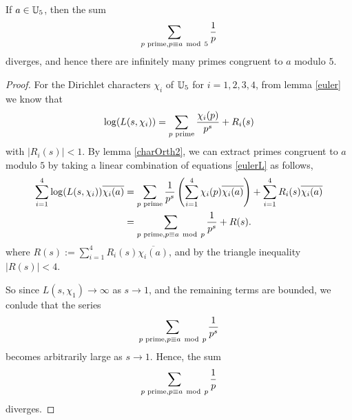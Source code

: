 \documentclass{unswmaths}
\begin{document}
    \begin{theorem}
        If $a \in \mathbb{U}_5$, then the sum
        \begin{equation*}
            \sum_{{p\text{ prime}}, p \equiv a \;\operatorname{mod}\;5} \frac{1}{p}
        \end{equation*}
        diverges, and hence there are infinitely many primes congruent to $a$ modulo $5$.
    \end{theorem}
    \begin{proof}
        For the Dirichlet characters $\chi_i$ of $\mathbb{U}_5$ for $i = 1,2,3,4$, from lemma \ref{euler} we know that
        \begin{equation*}
        \label{eulerL}
            \log(L(s,\chi_i)) = \sum_{{p\text{ prime}}} \frac{\chi_i(p)}{p^s}+R_i(s)
        \end{equation*}
        with $|R_i(s)| < 1$. By lemma \ref{charOrth2}, we can extract primes congruent to $a$ modulo $5$
        by taking a linear combination of equations \ref{eulerL} as follows,
        \begin{align*}
            \sum_{i=1}^4 \log(L(s,\chi_i))\overline{\chi_i(a)} &= \sum_{{p\text{ prime}}} \frac{1}{p^s}\left(\sum_{i=1}^4 \chi_i(p)\overline{\chi_i(a)}\right) + \sum_{i=1}^4 R_i(s)\overline{\chi_i(a)}\\
            &= \sum_{{p\text{ prime}}, p\equiv a\;\operatorname{mod}\;p} \frac{1}{p^s} + R(s).
        \end{align*}
        where $R(s) := \sum_{i=1}^4 R_i(s)\overline{\chi_i(a)}$, and by the triangle inequality $|R(s)| < 4$.
        
        So since $L(s,\chi_1) \rightarrow \infty$ as $s\rightarrow 1$, and the remaining terms are bounded, we
        conlude that the series
        \begin{equation*}
            \sum_{{p\text{ prime}}, p\equiv a\;\operatorname{mod}\;p} \frac{1}{p^s}
        \end{equation*}
        becomes arbitrarily large as $s\rightarrow 1$. Hence, 
        the sum
        \begin{equation*}
            \sum_{{p\text{ prime}}, p\equiv a\;\operatorname{mod}\;p} \frac{1}{p}
        \end{equation*}
        diverges.
    \end{proof} 
    
    
\end{document}
